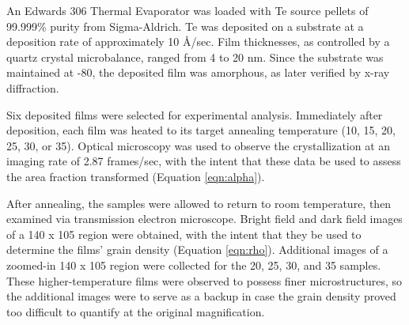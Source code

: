 An Edwards 306 Thermal Evaporator was loaded with Te source pellets of 99.999\% purity from Sigma-Aldrich.  Te was deposited on a substrate at a deposition rate of approximately 10 \r{A}/sec.  Film thicknesses, as controlled by a quartz crystal microbalance, ranged from 4 to 20 nm.  Since the substrate was maintained at -80, the deposited film was amorphous, as later verified by x-ray diffraction.

Six deposited films were selected for experimental analysis.  Immediately after deposition, each film was heated to its target annealing temperature (10, 15, 20, 25, 30, or 35).  Optical microscopy was used to observe the crystallization at an imaging rate of 2.87 frames/sec, with the intent that these data be used to assess the area fraction transformed (Equation \ref{eqn:alpha}).

After annealing, the samples were allowed to return to room temperature, then examined via transmission electron microscope.  Bright field and dark field images of a 140  x 105  region were obtained, with the intent that they be used to determine the films' grain density (Equation \ref{eqn:rho}).  Additional images of a zoomed-in 140  x 105  region were collected for the 20, 25, 30, and 35 samples.  These higher-temperature films were observed to possess finer microstructures, so the additional images were to serve as a backup in case the grain density proved too difficult to quantify at the original magnification.
